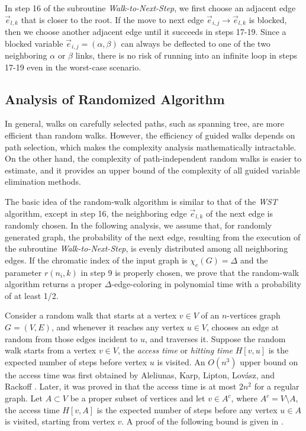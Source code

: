\documentclass[11pt]{article}
\begin{document}
In step 16 of the subroutine {\it Walk-to-Next-Step}, we first choose an adjacent edge $\vec{e}_{l,k}$ that is closer to the root. If the move to next edge $\vec{e}_{i,j} \rightarrow \vec{e}_{l,k}$ is blocked, then we choose another adjacent edge until it succeeds in steps 17-19. Since a blocked variable $\vec{e}_{i,j}=(\alpha,\beta)$ can always be deflected to one of the two neighboring $\alpha$ or $\beta$ links, there is no risk of running into an infinite loop in steps 17-19 even in the worst-case scenario. 

\subsection{Analysis of Randomized Algorithm}

In general, walks on carefully selected paths, such as spanning tree, are more efficient than random walks. However, the efficiency of guided walks depends on path selection, which makes the complexity analysis mathematically intractable. On the other hand, the complexity of path-independent random walks is easier to estimate, and it provides an upper bound of the complexity of all guided variable elimination methods. 

The basic idea of the random-walk algorithm is similar to that of the {\it WST} algorithm, except in step 16, the neighboring edge $\vec{e}_{l,k}$  of the next edge is randomly chosen. In the following analysis, we assume that, for randomly generated graph, the probability of the next edge, resulting from the execution of the subroutine {\it Walk-to-Next-Step}, is evenly distributed among all neighboring edges. If the chromatic index of the input graph is $\chi_e(G)=\Delta $ and the parameter $r(n_i,k)$ in step 9 is properly chosen, we prove that the random-walk algorithm returns a proper $\Delta$-edge-coloring in polynomial time with a probability of at least 1/2. 

Consider a random walk that starts at a vertex $v \in V$ of an $n$-vertices graph $G=(V,E)$, and whenever it reaches any vertex $u \in V$, chooses an edge at random from those edges incident to $u$, and traverses it. Suppose the random walk starts from a vertex  $v \in V$, the {\it access time} or {\it hitting time} $H[v,u]$ is the expected number of steps before vertex $u$ is visited. An $O(n^3)$ upper bound on the access time was first obtained by Aleliunas, Karp, Lipton, Lov{\'a}sz, and Rackoff \cite{Aleliunas1979random}. Later, it was proved in \cite{lovsz1993random} that the access time is at most $2n^2$ for a regular graph. Let $A\subset V$ be a proper subset of vertices and let $v\in A^c$, where $A^c=V \setminus A$, the access time $H[v,A]$ is the expected number of steps before any vertex $u\in A$ is visited, starting from vertex $v$. A proof of the following bound is given in \cite{aldous2002reversible}.
\end{document}
